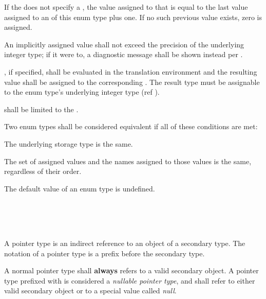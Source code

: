 \specsubsubitem
If the  does not specify a
, the value assigned to that 
is equal to the last value assigned to an  of this enum
type plus one. If no such previous value exists, zero is assigned.

\specsubsubitem
An implicitly assigned value shall not exceed the precision of the underlying
integer type; if it were to, a diagnostic message shall be shown instead per
.

\specsubsubitem
{}, if specified, shall be evaluated in the
translation environment and the resulting value shall be assigned to the
corresponding . The result type must be assignable to
the enum type's underlying integer type (ref ).

\specsubsubitem
{} shall be limited to the
.

\specsubsubitem
Two enum types shall be considered equivalent if all of these conditions are
met:

\begin{subsubitemize}
\item
The underlying storage type is the same.
\item
The set of assigned values and the names assigned to those values is the same,
regardless of their order.
\end{subsubitemize}

\specsubsubitem
The default value of an enum type is undefined.


\begin{grammar}
 \\
	\terminal{*}  \\
	 \terminal{*}  \\
\end{grammar}

\specsubsubitem
A pointer type is an indirect reference to an object of a secondary type. The
notation of a pointer type is a \terminal{*} prefix before the secondary type.

\specsubsubitem
A normal pointer type shall \textbf{always} refers to a valid secondary object.
A pointer type prefixed with  is considered a
\textit{nullable pointer type}, and shall refer to either valid secondary object
or to a special value called \textit{null}.

